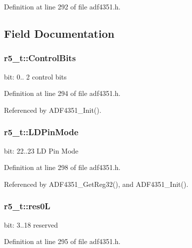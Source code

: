 Definition at line 292 of file adf4351.\+h.



\subsection{Field Documentation}
\subsubsection[{\texorpdfstring{Control\+Bits}{ControlBits}}]{ r5\+\_\+t\+::\+Control\+Bits}\hypertarget{structr5__t_aa71c458a3167da85d477b00cf0ae346a}{}\label{structr5__t_aa71c458a3167da85d477b00cf0ae346a}
bit\+: 0.. 2 control bits 

Definition at line 294 of file adf4351.\+h.



Referenced by A\+D\+F4351\+\_\+\+Init().

\subsubsection[{\texorpdfstring{L\+D\+Pin\+Mode}{LDPinMode}}]{ r5\+\_\+t\+::\+L\+D\+Pin\+Mode}\hypertarget{structr5__t_a55135418b639eabcc007205a689dd828}{}\label{structr5__t_a55135418b639eabcc007205a689dd828}
bit\+: 22..23 LD Pin Mode 

Definition at line 298 of file adf4351.\+h.



Referenced by A\+D\+F4351\+\_\+\+Get\+Reg32(), and A\+D\+F4351\+\_\+\+Init().

\subsubsection[{\texorpdfstring{res0L}{res0L}}]{ r5\+\_\+t\+::res0L}\hypertarget{structr5__t_ac295706ea60257469bdd2074f7ec3197}{}\label{structr5__t_ac295706ea60257469bdd2074f7ec3197}
bit\+: 3..18 reserved 

Definition at line 295 of file adf4351.\+h.



